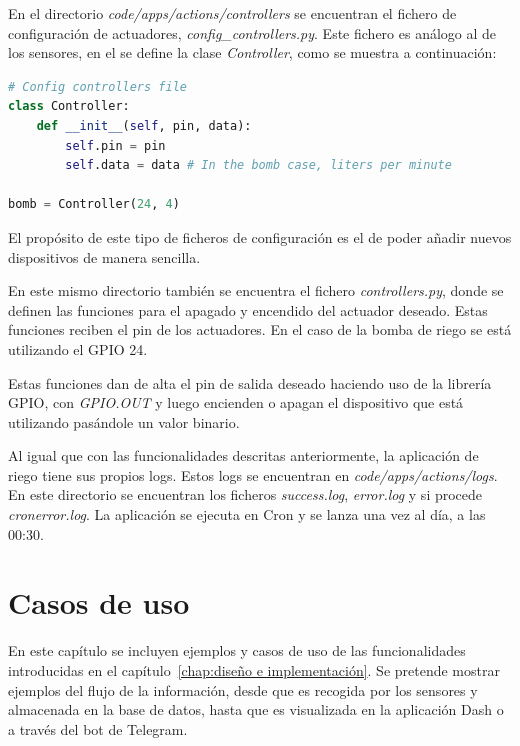 \documentclass[a4paper, 12pt, oneside]{book}
\begin{document}
En el directorio \textit{code/apps/actions/controllers} se encuentran el fichero de configuración de actuadores, \textit{config\_controllers.py}. Este fichero es análogo al de los sensores, en el se define la clase \textit{Controller}, como se muestra a continuación:  

\begin{lstlisting}[language=Python]
# Config controllers file
class Controller:
    def __init__(self, pin, data):
        self.pin = pin
        self.data = data # In the bomb case, liters per minute

bomb = Controller(24, 4)
\end{lstlisting}

El propósito de este tipo de ficheros de configuración es el de poder añadir nuevos dispositivos de manera sencilla. 

En este mismo directorio también se encuentra el fichero \textit{controllers.py}, donde se definen las funciones para el apagado y encendido del actuador deseado. Estas funciones reciben el pin de los actuadores. En el caso de la bomba de riego se está utilizando el GPIO 24.

Estas funciones dan de alta el pin de salida deseado haciendo uso de la librería GPIO, con \textit{GPIO.OUT} y luego encienden o apagan el dispositivo que está utilizando pasándole un valor binario.

Al igual que con las funcionalidades descritas anteriormente, la aplicación de riego tiene sus propios logs. Estos logs se encuentran en \textit{code/apps/actions/logs}. En este directorio se encuentran los ficheros \textit{success.log}, \textit{error.log} y si procede \textit{cronerror.log}.
La aplicación se ejecuta en Cron y se lanza una vez al día, a las 00:30.


\cleardoublepage
\chapter{Casos de uso}
\label{chap:casos de uso}

En este capítulo se incluyen ejemplos y casos de uso de las funcionalidades introducidas en el capítulo~\ref{chap:diseño e implementación}. Se pretende mostrar ejemplos del flujo de la información, desde que es recogida por los sensores y almacenada en la base de datos, hasta que es visualizada en la aplicación Dash o a través del bot de Telegram.
\end{document}
